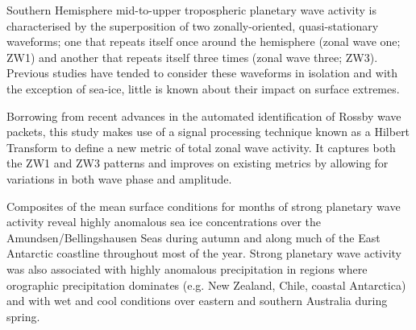 Southern Hemisphere mid-to-upper tropospheric planetary wave activity is characterised by the superposition of two zonally-oriented, quasi-stationary waveforms; one that repeats itself once around the hemisphere (zonal wave one; ZW1) and another that repeats itself three times (zonal wave three; ZW3). Previous studies have tended to consider these waveforms in isolation and with the exception of sea-ice, little is known about their impact on surface extremes. 

Borrowing from recent advances in the automated identification of Rossby wave packets, this study makes use of a signal processing technique known as a Hilbert Transform to define a new metric of total zonal wave activity. It captures both the ZW1 and ZW3 patterns and improves on existing metrics by allowing for variations in both wave phase and amplitude.

Composites of the mean surface conditions for months of strong planetary wave activity reveal highly anomalous sea ice concentrations over the Amundsen/Bellingshausen Seas during autumn and along much of the East Antarctic coastline throughout most of the year. Strong planetary wave activity was also associated with highly anomalous precipitation in regions where orographic precipitation dominates (e.g. New Zealand, Chile, coastal Antarctica) and with wet and cool conditions over eastern and southern Australia during spring. 

